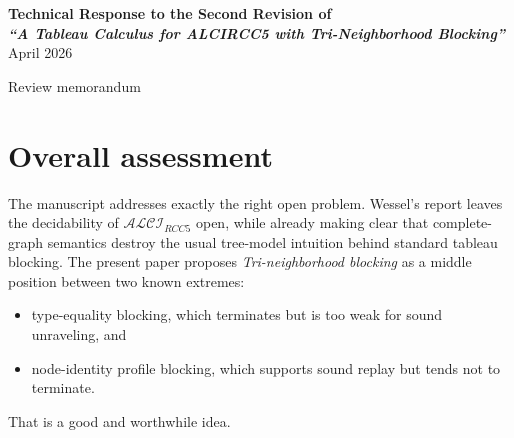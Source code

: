 \documentclass[11pt]{article}
\newcommand{\ALCIRCC}{\ensuremath{\mathcal{ALCI}_{RCC5}}}
\begin{document}
\begin{center}
    {\LARGE\bfseries Technical Response to the Second Revision of\\[2pt]
    \emph{``A Tableau Calculus for ALCIRCC5 with Tri-Neighborhood Blocking''}}\\[10pt]
    {\large April 2026}\par
    \vspace{6pt}
    {\normalsize Review memorandum}
\end{center}

\vspace{8pt}

\begin{abstract}
This revision is a meaningful improvement over the earlier tableau draft. The new
Tri-neighborhood invariant is a better blocking candidate than plain triangle-type-set
equality, the manuscript now treats the same-map obstruction explicitly, and Section~8.5
is commendably candid about several weak points. Nevertheless, I do not think the main
decidability claim is proved yet.

Two issues remain decisive. First, the termination proof still lacks a valid global
argument bounding the total number of node creations. Second, the soundness argument
breaks already at the level of the initial domains in Definition~5.4: same-map pairs can
have empty domains even before T-filtering begins. This gives a concrete counterexample
to the initial non-emptiness claim in Lemma~5.5. Beyond that, the revised proof of
Lemma~5.5 remains partly heuristic and partly experimental.

My conclusion is therefore the same in substance as before, though for narrower reasons:
the paper contains real progress, but Theorems~4.1,~5.9, and~6.1 should not yet be
presented as established results.
\end{abstract}

\section{Overall assessment}

The manuscript addresses exactly the right open problem. Wessel's report leaves the
decidability of \ALCIRCC{} open, while already making clear that complete-graph
semantics destroy the usual tree-model intuition behind standard tableau blocking.
The present paper proposes \emph{Tri-neighborhood blocking} as a middle position
between two known extremes:
\begin{itemize}
    \item type-equality blocking, which terminates but is too weak for sound unraveling, and
    \item node-identity profile blocking, which supports sound replay but tends not to terminate.
\end{itemize}
That is a good and worthwhile idea.
\end{document}
